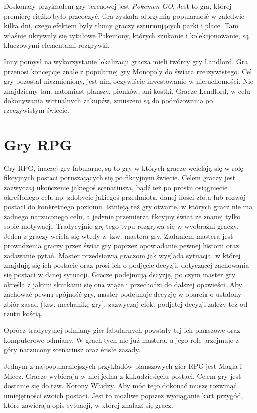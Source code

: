 \documentclass[openright]{xmgr}
\begin{document}
Doskonały przykładem gry terenowej jest \textit{Pokemon GO}. Jest to gra, której premierę ciężko było przeoczyć. Gra zyskała olbrzymią popularność w zaledwie kilka dni, czego efektem były tłumy graczy szturmujących parki i place. Tam właśnie ukrywały się tytułowe Pokemony, których szukanie i kolekcjonowanie, są kluczowymi elementami rozgrywki.

Inny pomysł na wykorzystanie lokalizacji gracza mieli twórcy gry Landlord. Gra przenosi koncepcje znale z popularnej gry Monopoly do świata rzeczywistego. Cel gry pozostał niezmieniony, jest nim oczywiście inwestowanie w nieruchomości. Nie znajdziemy tam natomiast planszy, pionków, ani kostki. Gracze Landlord, w celu dokonywania wirtualnych zakupów, zmuszeni są do podróżowania po rzeczywistym świecie.

\section{Gry RPG}

Gry RPG, inaczej gry fabularne, są to gry w których gracze wcielają się w rolę fikcyjnych postaci poruszających się po fikcyjnym świecie.  Celem graczy jest zazwyczaj ukończenie jakiegoś scenariusza, bądź też po prostu osiągniecie określonego celu np. zdobycie jakiegoś przedmiotu, danej ilości złota lub rozwój postaci do konkretnego poziomu. Istnieją też gry otwarte, w których gracz nie ma żadnego narzuconego celu, a jedynie przemierza fikcyjny świat ze znanej tylko sobie motywacji. Tradycyjnie grę tego typu rozgrywa się w wyobraźni graczy. Jeden z graczy wciela się wtedy w tzw. mastera gry. Zadaniem mastera jest prowadzenia graczy przez świat gry poprzez opowiadanie pewnej historii oraz zadawanie pytań. Master przedstawia graczom jak wygląda sytuacja, w której znajdują się ich postacie oraz prosi ich o podjęcie decyzji, dotyczącej zachowania się postaci w danej sytuacji. Gracze podejmują decyzję, po czym master gry określa z jakimi skutkami się ona wiąże i przechodzi do dalszej opowieści. Aby zachować pewną spójność gry, master podejmuje decyzję w oparciu o ustalony zbiór zasad (tzw. mechanikę gry), zazwyczaj efekt podjętej decyzji zależy też od rzutu kością.

Oprócz tradycyjnej odmiany gier fabularnych powstały tej ich planszowe oraz komputerowe odmiany. W grach tych nie już mastera, a jego rolę przejmuje z góry narzucony scenariusz oraz ścisłe zasady. 

Jednym z najpopularniejszych przykładów planszowych gier RPG jest Magia i Miecz. Gracze wybierają w niej jedną z kilkudziesięciu postaci. Celem gry jest dostanie się do tzw. Korony Władzy. Aby móc tego dokonać muszę rozwinąć umiejętności swoich postaci. Jest to możliwe poprzez wyciąganie kart przygód, które zawierają opis sytuacji, w której znalazł się gracz. 
\end{document}
